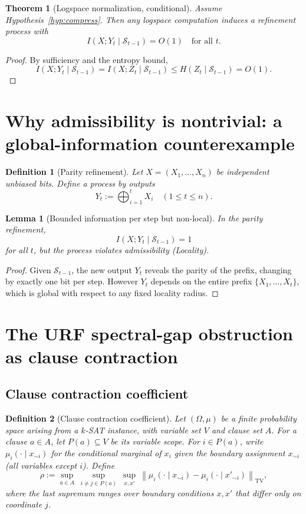 \documentclass[11pt]{article}
\newtheorem{theorem}{Theorem}
\newtheorem{lemma}{Lemma}
\newtheorem{definition}{Definition}
\begin{document}
\begin{theorem}[Logspace normalization, conditional]\label{thm:lsn}
Assume Hypothesis~\ref{hyp:compress}. Then any logspace computation induces a refinement process with
\[
I(X;Y_t \mid \mathcal S_{t-1}) = O(1)\quad\text{for all }t.
\]
\end{theorem}

\begin{proof}
By sufficiency and the entropy bound,
\[
I(X;Y_t \mid \mathcal S_{t-1})
= I(X;Z_t \mid \mathcal S_{t-1})
\le H(Z_t \mid \mathcal S_{t-1})
= O(1).
\]
\end{proof}

\section{Why admissibility is nontrivial: a global-information counterexample}

\begin{definition}[Parity refinement]\label{def:parity}
Let $X=(X_1,\dots,X_n)$ be independent unbiased bits.
Define a process by outputs
\[
Y_t := \bigoplus_{i=1}^{t} X_i \quad (1\le t\le n).
\]
\end{definition}

\begin{lemma}[Bounded information per step but non-local]\label{lem:parity}
In the parity refinement,
\[
I(X;Y_t \mid \mathcal S_{t-1}) = 1
\]
for all $t$, but the process violates admissibility (Locality).
\end{lemma}

\begin{proof}
Given $\mathcal S_{t-1}$, the new output $Y_t$ reveals the parity of the prefix, changing by exactly one bit per step.
However $Y_t$ depends on the entire prefix $\{X_1,\dots,X_t\}$, which is global with respect to any fixed locality radius.
\end{proof}

\section{The URF spectral-gap obstruction as clause contraction}

\subsection{Clause contraction coefficient}

\begin{definition}[Clause contraction coefficient]\label{def:rho}
Let $(\Omega,\mu)$ be a finite probability space arising from a $k$-SAT instance, with variable set $V$ and clause set $A$.
For a clause $a\in A$, let $P(a)\subseteq V$ be its variable scope.
For $i\in P(a)$, write $\mu_i(\cdot\mid x_{\sim i})$ for the conditional marginal of $x_i$ given the boundary assignment
$x_{\sim i}$ (all variables except $i$).
Define
\[
\rho := \sup_{a\in A}\ \sup_{i\neq j\in P(a)}\ \sup_{x,x'}\ \left\|
\mu_i(\cdot\mid x_{\sim i}) - \mu_i(\cdot\mid x'_{\sim i})
\right\|_{\mathrm{TV}},
\]
where the last supremum ranges over boundary conditions $x,x'$ that differ only on coordinate $j$.
\end{definition}
\end{document}
